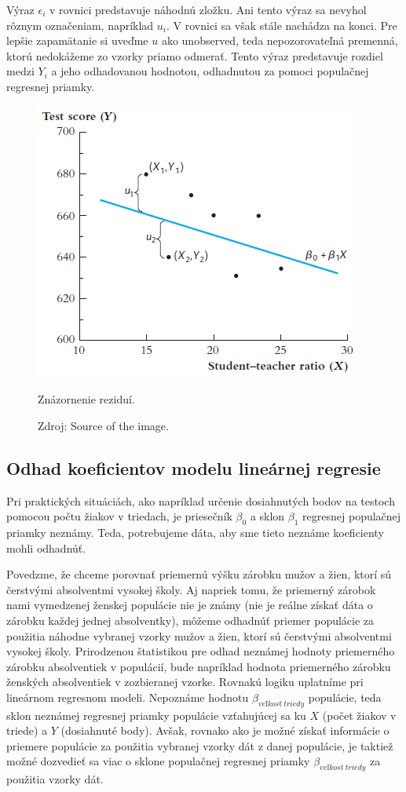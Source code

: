 \documentclass[]{tukediphc}
\begin{document}
Výraz $\epsilon_i$ v rovnici predstavuje náhodnú zložku. Ani tento výraz sa nevyhol rôznym označeniam, napríklad $u_i$. V rovnici sa však stále nachádza na konci. Pre lepšie zapamätanie si uveďme $u$ ako unobserved, teda nepozorovateľná premenná, ktorú nedokážeme zo vzorky priamo odmerať. Tento výraz predstavuje rozdiel medzi $Y_i$ a jeho odhadovanou hodnotou, odhadnutou za pomoci populačnej regresnej priamky.  \\


\begin{figure}
    \centering
    \includegraphics[scale=1.5]{diplomka obrazky/10.png}
    \caption{Znázornenie reziduí.}
    \caption*{Zdroj: Source of the image.}
\end{figure}

\subsection{Odhad koeficientov modelu lineárnej regresie}

Pri praktických situáciách, ako napríklad určenie dosiahnutých bodov na testoch pomocou počtu žiakov v triedach, je priesečník $\beta_0$ a sklon $\beta_1$ regresnej populačnej priamky neznámy. Teda, potrebujeme dáta, aby sme tieto neznáme koeficienty mohli odhadnúť. 

Povedzme, že chceme porovnať priemernú výšku zárobku mužov a žien, ktorí sú čerstvými absolventmi vysokej školy. Aj napriek tomu, že priemerný zárobok nami vymedzenej ženskej populácie nie je známy (nie je reálne získať dáta o zárobku každej jednej absolventky), môžeme odhadnúť priemer populácie za použitia náhodne vybranej vzorky mužov a žien, ktorí sú čerstvými absolventmi vysokej školy. Prirodzenou štatistikou pre odhad neznámej hodnoty priemerného zárobku absolventiek v populácií, bude napríklad hodnota priemerného zárobku ženských absolventiek v zozbieranej vzorke. Rovnakú logiku uplatníme pri lineárnom regresnom modeli. Nepoznáme hodnotu $\beta_{veľkosť \ triedy}$ populácie, teda sklon neznámej regresnej priamky populácie vzťahujúcej sa ku $X$ (počet žiakov v triede) a $Y$ (dosiahnuté body). Avšak, rovnako ako je možné získať informácie o priemere populácie za použitia vybranej vzorky dát z danej populácie, je taktiež možné dozvedieť sa viac o sklone populačnej regresnej priamky $\beta_{veľkosť \ triedy}$ za použitia vzorky dát. 
\end{document}
